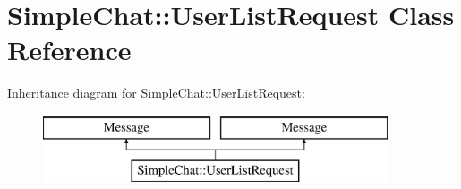 \hypertarget{classSimpleChat_1_1UserListRequest}{\section{Simple\-Chat\-:\-:User\-List\-Request Class Reference}
\label{classSimpleChat_1_1UserListRequest}
}
Inheritance diagram for Simple\-Chat\-:\-:User\-List\-Request\-:\begin{figure}[H]
\begin{center}
\leavevmode
\includegraphics[height=2.000000cm]{classSimpleChat_1_1UserListRequest}
\end{center}
\end{figure}
